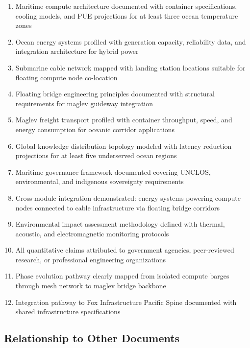 \documentclass[11pt,letterpaper]{article}
\begin{document}
\begin{enumerate}[leftmargin=2em]
  \item Maritime compute architecture documented with container specifications, cooling models, and PUE projections for at least three ocean temperature zones
  \item Ocean energy systems profiled with generation capacity, reliability data, and integration architecture for hybrid power
  \item Submarine cable network mapped with landing station locations suitable for floating compute node co-location
  \item Floating bridge engineering principles documented with structural requirements for maglev guideway integration
  \item Maglev freight transport profiled with container throughput, speed, and energy consumption for oceanic corridor applications
  \item Global knowledge distribution topology modeled with latency reduction projections for at least five underserved ocean regions
  \item Maritime governance framework documented covering UNCLOS, environmental, and indigenous sovereignty requirements
  \item Cross-module integration demonstrated: energy systems powering compute nodes connected to cable infrastructure via floating bridge corridors
  \item Environmental impact assessment methodology defined with thermal, acoustic, and electromagnetic monitoring protocols
  \item All quantitative claims attributed to government agencies, peer-reviewed research, or professional engineering organizations
  \item Phase evolution pathway clearly mapped from isolated compute barges through mesh network to maglev bridge backbone
  \item Integration pathway to Fox Infrastructure Pacific Spine documented with shared infrastructure specifications
\end{enumerate}

\subsection{Relationship to Other Documents}
\end{document}
